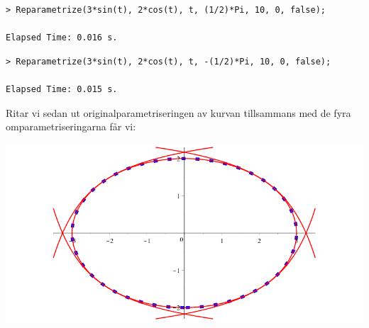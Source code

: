 \begin{maplegroup}
\begin{verbatim}
> Reparametrize(3*sin(t), 2*cos(t), t, (1/2)*Pi, 10, 0, false);

Elapsed Time: 0.016 s.
\end{verbatim}
\mapleresult
\begin{maplelatex}
\end{maplelatex}
\end{maplegroup}

\begin{maplegroup}
\begin{verbatim}
> Reparametrize(3*sin(t), 2*cos(t), t, -(1/2)*Pi, 10, 0, false);

Elapsed Time: 0.015 s.
\end{verbatim}
\mapleresult
\begin{maplelatex}
\end{maplelatex}
\end{maplegroup}

\vspace{20pt}
Ritar vi sedan ut originalparametriseringen av kurvan tillsammans med de fyra omparametriseringarna får vi:

\begin{center}
\includegraphics[scale=0.35]{Export/kurvorplot2d2.png}
\end{center}

